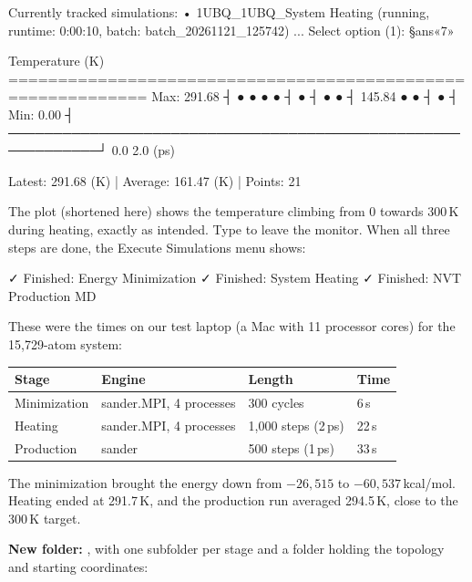 \begin{screen}
Currently tracked simulations:
  • 1UBQ_1UBQ_System Heating
    (running, runtime: 0:00:10, batch: batch_20261121_125742)
...
Select option (1): §ans«7»

Temperature (K)
============================================================
Max:   291.68                                                ┤
                                               ●  ●  ●  ●    ┤
                                   ●                         ┤
                       ●  ●                                  ┤   145.84
        ●  ●                                                 ┤
●                                                            ┤
Min:     0.00                                                ┤
────────────────────────────────────────────────────────────┘
     0.0                                                 2.0 (ps)

Latest: 291.68 (K) | Average: 161.47 (K) | Points: 21
\end{screen}

The plot (shortened here) shows the temperature climbing from 0 towards
300\,K during heating, exactly as intended. Type  to leave the monitor.
When all three steps are done, the Execute Simulations menu shows:

\begin{screen}
✓ Finished: Energy Minimization
✓ Finished: System Heating
✓ Finished: NVT Production MD
\end{screen}

These were the times on our test laptop (a Mac with 11 processor cores) for
the 15,729-atom system:

\begin{tabularx}{\linewidth}{@{}lllL@{}}
\toprule
\textbf{Stage} & \textbf{Engine} & \textbf{Length} & \textbf{Time} \\
\midrule
Minimization & sander.MPI, 4 processes & 300 cycles & 6\,s \\
Heating & sander.MPI, 4 processes & 1,000 steps (2\,ps) & 22\,s \\
Production & sander & 500 steps (1\,ps) & 33\,s \\
\bottomrule
\end{tabularx}

\medskip
The minimization brought the energy down from $-26{,}515$ to
$-60{,}537$\,kcal/mol. Heating ended at 291.7\,K, and the production run
averaged 294.5\,K, close to the 300\,K target.

\textbf{New folder:} , with one
subfolder per stage and a  folder holding the topology and
starting coordinates:


